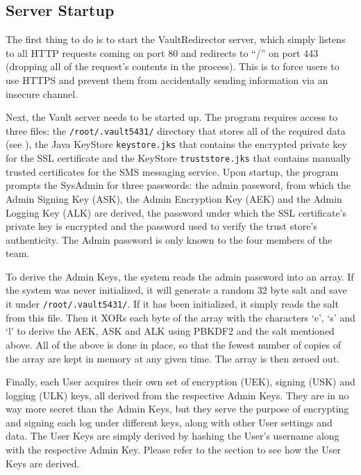\documentclass{article}
\begin{document}
\subsection{Server Startup}
\label{sub:server_startup}
\par The first thing to do is to start the VaultRedirector server, which simply listens to all HTTP requests coming on port 80 and redirects to ``/'' on port 443 (dropping all of the request's contents in the process). This is to force users to use HTTPS and prevent them from accidentally sending information via an insecure channel.
\par Next, the Vault server needs to be started up. The program requires access to three files: the \texttt{/root/.vault5431/} directory that stores all of the required data (see ), the Java KeyStore \texttt{keystore.jks} that contains the encrypted private key for the SSL certificate and the KeyStore \texttt{truststore.jks} that contains manually trusted certificates for the SMS messaging service. Upon startup, the program prompts the SysAdmin for three passwords: the admin password, from which the Admin Signing Key (ASK), the Admin Encryption Key (AEK) and the Admin Logging Key (ALK) are derived, the password under which the SSL certificate's private key is encrypted and the password used to verify the trust store's authenticity. The Admin password is only known to the four members of the team.
\par To derive the Admin Keys, the system reads the admin password into an array. If the system was never initialized, it will generate a random 32 byte salt and save it under \texttt{/root/.vault5431/}. If it has been initialized, it simply reads the salt from this file. Then it XORs each byte of the array with the characters `e', `s' and `l' to derive the AEK, ASK and ALK using PBKDF2 and the salt mentioned above. All of the above is done in place, so that the fewest number of copies of the array are kept in memory at any given time. The array is then zeroed out.
\par Finally, each User acquires their own set of encryption (UEK), signing (USK) and logging (ULK) keys, all derived from the respective Admin Keys. They are in no way more secret than the Admin Keys, but they serve the purpose of encrypting and signing each log under different keys, along with other User settings and data. The User Keys are simply derived by hashing the User's username along with the respective Admin Key. Please refer to the  section to see how the User Keys are derived.
\end{document}
